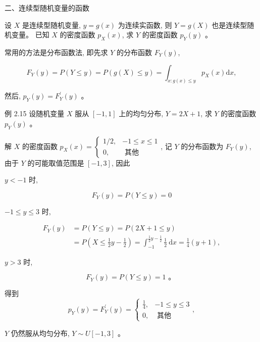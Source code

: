 \documentclass{beamer}
\begin{document}
	\begin{frame}
		二、连续型随机变量的函数
		
		设 $X$ 是连续型随机变量, $y=g(x)$ 为连续实函数, 则 $Y=g(X)$ 也是连续型随机变量。 已知 $X$ 的密度函数 $p_{X}(x)$, 求 $Y$ 的密度函数 $p_{Y}(y)$ 。
		
		常用的方法是分布函数法, 即先求 $Y$ 的分布函数 $F_{Y}(y)$,
		
		$$
		F_{Y}(y)=P(Y \leqslant y)=P(g(X) \leqslant y)=\int_{x: g(x) \leqslant y} p_{X}(x) \mathrm{d} x,
		$$
		
		然后, $p_{Y}(y)=F_{Y}^{\prime}(y)$ 。
	\end{frame}
	
	\begin{frame}
		例 2.15 设随机变量 $X$ 服从 $[-1,1]$ 上的均匀分布, $Y=2 X+1$, 求 $Y$ 的密度函数 $p_{Y}(y)$ 。
	\end{frame}
	
	\begin{frame}
		解 $X$ 的密度函数 $p_{X}(x)=\left\{\begin{array}{cc}1 / 2, & -1 \leqslant x \leqslant 1 \\ 0, & \text { 其他 }\end{array}\right.$, 记 $Y$ 的分布函数为 $F_{Y}(y)$, 由于 $Y$ 的可能取值范围是 $[-1,3]$, 因此
		
		$y<-1$ 时,
		
		$$
		F_{Y}(y)=P(Y \leqslant y)=0
		$$
		
		$-1 \leqslant y \leqslant 3$ 时,
		
		$$
		\begin{aligned}
			F_{Y}(y) & =P(Y \leqslant y)=P(2 X+1 \leqslant y) \\
			& =P\left(X \leqslant \frac{1}{2} y-\frac{1}{2}\right)=\int_{-1}^{\frac{1}{2} y-\frac{1}{2}} \frac{1}{2} \mathrm{~d} x=\frac{1}{4}(y+1),
		\end{aligned}
		$$
		
		$y>3$ 时,
		
		$$
		F_{Y}(y)=P(Y \leqslant y)=1 \text { 。 }
		$$
		
		得到
		$$
		p_{Y}(y)=F_{Y}^{\prime}(y)=\left\{\begin{array}{cc}
			\frac{1}{4}, & -1 \leqslant y \leqslant 3 \\
			0, & \text { 其他 }
		\end{array},\right.
		$$
		
		$Y$ 仍然服从均匀分布, $Y \sim U[-1,3]$ 。
	\end{frame}
	
\end{document}
